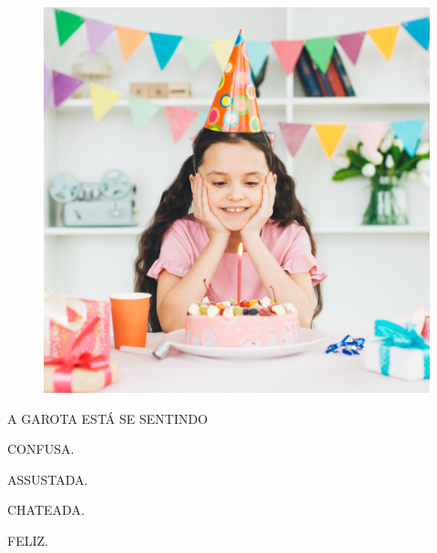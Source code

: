 \begin{minipage}{.5\textwidth}
\begin{figure}[H]
\includegraphics[width=\textwidth]{media/image175c.jpg}
\end{figure}
\end{minipage}
\hspace{.5cm}
\begin{minipage}{.5\textwidth}
A GAROTA ESTÁ SE SENTINDO

\begin{escolha}
\item CONFUSA.

\item ASSUSTADA.

\item CHATEADA.

\item FELIZ.
\end{escolha}
\end{minipage}